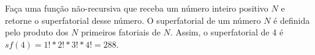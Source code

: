 
\question[10]

Faça uma função não-recursiva que receba um número inteiro positivo $N$ e retorne o superfatorial desse número. O superfatorial de um número $N$ é definida pelo produto dos $N$ primeiros fatoriais de $N$. Assim, o superfatorial de 4 é $sf(4) = 1! * 2! * 3! * 4! = 288$.

